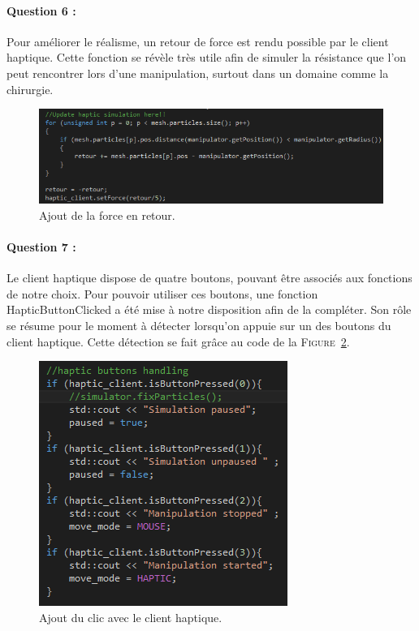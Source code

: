 \documentclass[a4paper,12pt]{article}
\begin{document}
\newpage\paragraph{Question 6 :} Pour améliorer le réalisme, un retour de force est rendu possible par le client haptique. Cette fonction se révèle très utile afin de simuler la résistance que l'on peut rencontrer lors d'une manipulation, surtout dans un domaine comme la chirurgie.
\begin{figure}[ht!]
  \centering
  \includegraphics[width=\textwidth]{images/retour_force.png}
  \caption{Ajout de la force en retour.}
  \label{fig:force}
\end{figure}

\paragraph{Question 7 :} Le client haptique dispose de quatre boutons, pouvant être associés aux fonctions de notre choix. Pour pouvoir utiliser ces boutons, une fonction \og{}HapticButtonClicked\fg{} a été mise à notre disposition afin de la compléter. Son rôle se résume pour le moment à détecter lorsqu'on appuie sur un des boutons du client haptique. Cette détection se fait grâce au code de la \textsc{Figure}~\ref{fig:clic}.
\begin{figure}[ht!]
  \centering
  \includegraphics{images/haptic_buttons.png}
  \caption{Ajout du clic avec le client haptique.}
  \label{fig:clic}
\end{figure}
\end{document}
